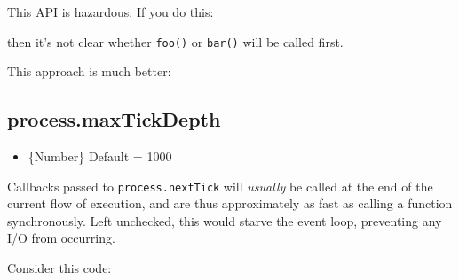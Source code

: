 This API is hazardous. If you do this:

\begin{Shaded}
\begin{Highlighting}[]
\NormalTok{, }\NormalTok{() \{}
\NormalTok{\});}
\end{Highlighting}
\end{Shaded}

then it's not clear whether \texttt{foo()} or \texttt{bar()} will be
called first.

This approach is much better:

\begin{Shaded}
\begin{Highlighting}[]
 
   
    \NormalTok{;}
  \NormalTok{\}}

  \NormalTok{(}
\NormalTok{\}}
\end{Highlighting}
\end{Shaded}

\subsection{process.maxTickDepth}

\begin{itemize}
\item
  \{Number\} Default = 1000
\end{itemize}

Callbacks passed to \texttt{process.nextTick} will \emph{usually} be
called at the end of the current flow of execution, and are thus
approximately as fast as calling a function synchronously. Left
unchecked, this would starve the event loop, preventing any I/O from
occurring.

Consider this code:

\begin{Shaded}
\begin{Highlighting}[]
\NormalTok{(} 
\NormalTok{\});}
\end{Highlighting}
\end{Shaded}

